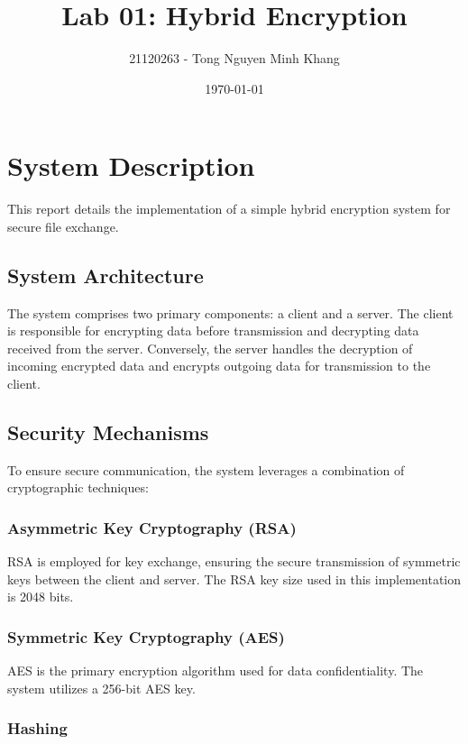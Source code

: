 \documentclass{article}
\title{Lab 01: Hybrid Encryption}
\author{21120263 - Tong Nguyen Minh Khang}
\date{\today}
\begin{document}
\maketitle

\section{System Description}

This report details the implementation of a simple hybrid encryption system for secure file exchange.

\subsection{System Architecture}

The system comprises two primary components: a client and a server. The client is responsible for encrypting data before transmission and decrypting data received from the server. Conversely, the server handles the decryption of incoming encrypted data and encrypts outgoing data for transmission to the client.

\subsection{Security Mechanisms}

To ensure secure communication, the system leverages a combination of cryptographic techniques:

\subsubsection{Asymmetric Key Cryptography (RSA)}

RSA is employed for key exchange, ensuring the secure transmission of symmetric keys between the client and server. The RSA key size used in this implementation is 2048 bits.

\subsubsection{Symmetric Key Cryptography (AES)}

AES is the primary encryption algorithm used for data confidentiality. The system utilizes a 256-bit AES key.

\subsubsection{Hashing}
\end{document}
